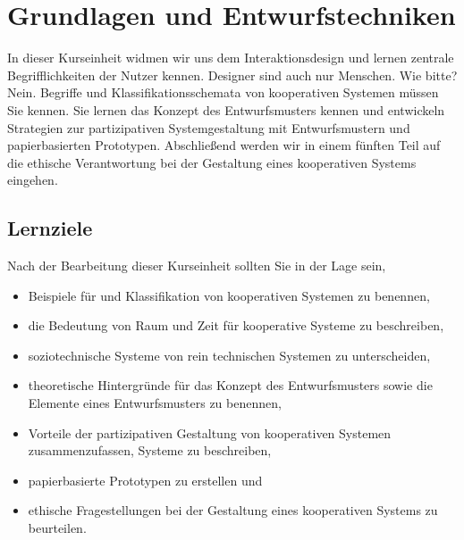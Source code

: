 
\vspace{-.5cm}
\chapter{Grundlagen und Entwurfstechniken}\label{grundlagen} 
\vspace{-.5cm}
In dieser Kurseinheit widmen wir uns dem Interaktionsdesign und lernen zentrale Begrifflichkeiten der Nutzer kennen.
Designer sind auch nur Menschen.
Wie bitte? Nein. 
Begriffe und Klassifikationsschemata von kooperativen Systemen müssen Sie kennen. Sie lernen das Konzept des Entwurfsmusters kennen und entwickeln Strategien zur partizipativen Systemgestaltung mit Entwurfsmustern und papierbasierten Prototypen. Abschließend werden wir in einem fünften Teil auf die ethische Verantwortung bei der Gestaltung eines kooperativen Systems eingehen.

\minitoc	
\vfill
\section*{Lernziele}
Nach der Bearbeitung dieser Kurseinheit sollten Sie in der Lage
sein,
\begin{itemize}
\item[\goal] Beispiele für und Klassifikation von kooperativen Systemen zu benennen,
\item[\goal] die Bedeutung von Raum und Zeit für kooperative Systeme zu beschreiben,
\item[\goal] soziotechnische Systeme von rein technischen Systemen zu unterscheiden,
\item[\goal] theoretische Hintergründe für das Konzept des Entwurfsmusters sowie die Elemente eines Entwurfsmusters zu
benennen,
\item[\goal] Vorteile der partizipativen Gestaltung von kooperativen Systemen zusammenzufassen,
Systeme zu beschreiben, 
\item[\goal] papierbasierte Prototypen zu erstellen und
\item[\goal] ethische Fragestellungen bei der Gestaltung eines kooperativen Systems zu beurteilen.
\end{itemize}

